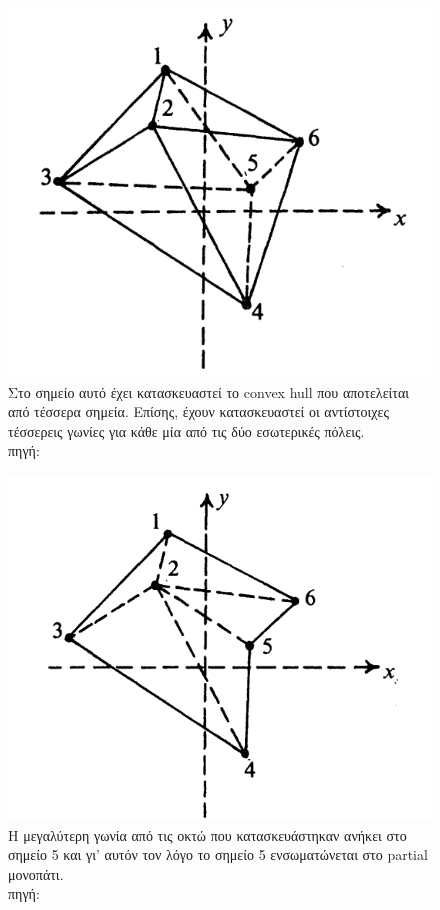 \documentclass[oneside,12pt]{book}
\newenvironment{matlab}
	{\begin{figure}[hp]\centering\captionsetup{justification=centering}}
	{\end{figure}}
\theoremstyle{definition}
\begin{document}
\begin{matlab}
	\includegraphics[scale=0.5]{images/geometric_approach_angle2.png}
	\caption{Στο σημείο αυτό έχει κατασκευαστεί το convex hull που αποτελείται από τέσσερα σημεία. Επίσης, έχουν κατασκευαστεί οι αντίστοιχες τέσσερεις γωνίες για κάθε μία από τις δύο εσωτερικές πόλεις. \\ πηγή: \cite{16}}
\end{matlab}

\begin{matlab}
	\includegraphics[scale=0.5]{images/geometric_approach_angle3.png}
	\caption{Η μεγαλύτερη γωνία από τις οκτώ που κατασκευάστηκαν ανήκει στο σημείο 5 και γι' αυτόν τον λόγο το σημείο 5 ενσωματώνεται στο partial μονοπάτι. \\ πηγή: \cite{16}}
\end{matlab}
\end{document}
